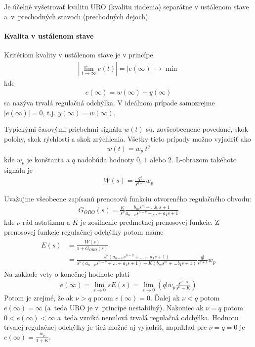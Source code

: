\documentclass[a4paper, 10pt, ]{article}
\begin{document}
Je účelné vyšetrovať kvalitu URO (kvalitu riadenia) separátne v ustálenom stave a~v~prechodných stavoch (prechodných dejoch).

\paragraph{Kvalita v ustálenom stave}

Kritériom kvality v ustálenom stave je v princípe
\begin{align}
    \left| \lim_{t \to \infty} e(t) \right| = \left| e(\infty) \right| \to \min
\end{align}
kde
\begin{align}
    e(\infty) = w(\infty) - y(\infty)
\end{align}
sa nazýva trvalá regulačná odchýlka. V ideálnom prípade samozrejme $\left| e(\infty) \right| = 0$, t.j. $y(\infty) = w(\infty)$.


Typickými časovými priebehmi signálu $w(t)$ sú, zovšeobecnene povedané, skok polohy, skok rýchlosti a skok zrýchlenia. Všetky tieto prípady možno vyjadriť ako
\begin{align}
    w(t) = w_p \ t^q
\end{align}
kde $w_p$ je konštanta a $q$ nadobúda hodnoty $0$, $1$ alebo $2$. L-obrazom takéhoto signálu je
\begin{align}
    W(s) = \frac{q!}{s^{q+1}}w_p
\end{align}


Uvažujme všeobecne zapísanú prenosovú funkciu otvoreného regulačného obvodu:
\begin{align}
    G_{ORO}(s) = \frac{K}{s^\nu} \frac{b_m s^m + \ldots b_1 s + 1}{a_{n-\nu}s^{n-\nu} + \ldots + a_1s + 1}
\end{align}
kde $\nu$ rád astatizmu a $K$ je zosilnenie predmetnej prenosovej funkcie. Z prenosovej funkcie  regulačnej odchýlky potom máme
\begin{align}
\begin{aligned}
    E(s) &= \frac{W(s)}{1 + G_{ORO}(s)}
    \\&= \frac{s^\nu \left( a_{n-\nu}s^{n-\nu} + \ldots + a_1s + 1 \right)}{s^\nu \left( a_{n-\nu}s^{n-\nu} + \ldots + a_1s + 1 \right) + K \left( b_m s^m + \ldots b_1 s + 1 \right)}
    \frac{q!}{s^{q+1}}w_p
\end{aligned}
\end{align}
Na základe vety o konečnej hodnote platí
\begin{align}
    e(\infty) = \lim_{s\to 0} s E(s) =  \lim_{s\to 0} \left( q! w_p \frac{s^{\nu-q}}{s^\nu + K} \right)
\end{align}
Potom je zrejmé, že ak $\nu > q$ potom $e(\infty) = 0$. Ďalej ak $\nu < q$ potom $e(\infty) = \infty$ (a~teda URO je v~princípe nestabilný). Nakoniec ak $\nu = q$ potom $ 0 < e(\infty) < \infty$ a~teda vzniká nenulová trvalá regulačná odchýlka. Hodnotu trvalej regulačnej odchýlky je tiež možné aj vyjadriť, napríklad pre $\nu = q = 0$ je $e(\infty) = \frac{w_p}{1 + K}$.
\end{document}
